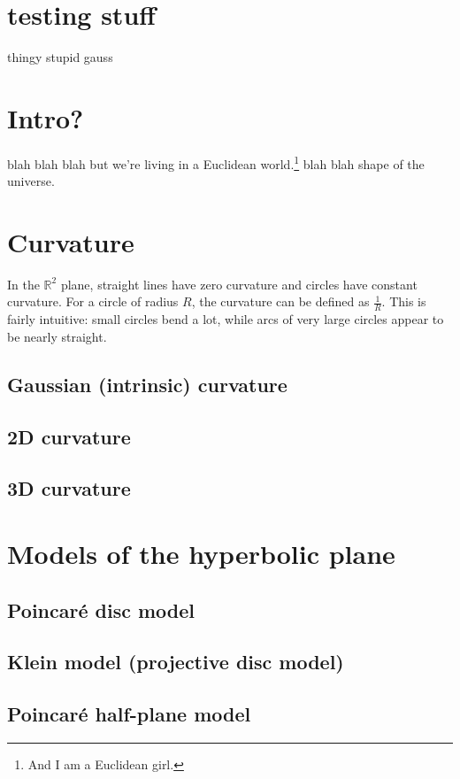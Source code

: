 \documentclass{article}
\title{\todo{FANCY TITLE}}
\author{BarbaraJoy Jones}
\date{\todo{16 October 2009}}
\begin{document}
\maketitle

\section{testing stuff}
thingy \cite{R3surfaces}
stupid gauss \cite{gauss}

\section{Intro?}
blah blah blah but we're living in a Euclidean world.\footnote{And I am a Euclidean girl.\cite{madonna}} blah blah shape of the universe.

\section{Curvature}
In the $\mathbb{R}^2$ plane, straight lines have zero curvature and circles have constant curvature.
For a circle of radius $R$, the curvature can be defined as $\frac{1}{R}$.
This is fairly intuitive: small circles bend a lot, while arcs of very large circles appear to be nearly straight.\cite{adventures}
\subsection{Gaussian (intrinsic) curvature}
\subsection{2D curvature}
\subsection{3D curvature}

\section{Models of the hyperbolic plane}
\subsection{Poincar\'e disc model}
\subsection{Klein model (projective disc model)}
\subsection{Poincar\'e half-plane model}
\end{document}

